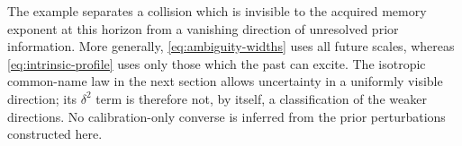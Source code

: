 The example separates a collision which is invisible to the acquired
memory exponent at this horizon from a vanishing direction of unresolved
prior information. More generally, \eqref{eq:ambiguity-widths} uses
all future scales, whereas \eqref{eq:intrinsic-profile} uses only those
which the past can excite. The isotropic common-name law in the next
section allows uncertainty in a uniformly visible direction; its
$\delta^2$ term is therefore not, by itself, a classification of the
weaker directions. No calibration-only converse is inferred from the
prior perturbations constructed here.
